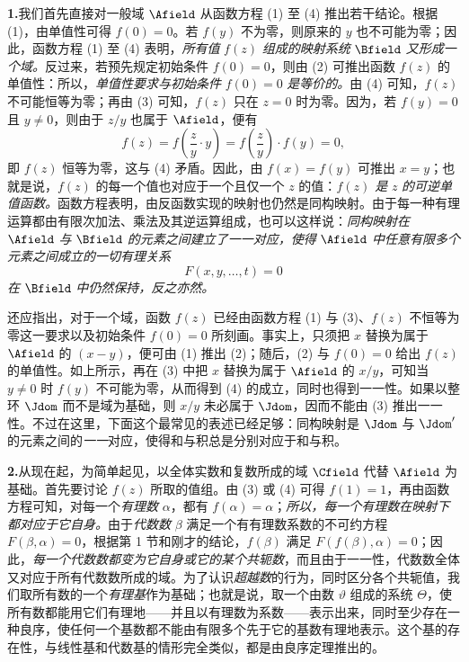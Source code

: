 \medskip
\noindent\textbf{1.}\quad 我们首先直接对一般域 \(\Afield\) 从函数方程 (1) 至 (4) 推出若干结论。根据 (1)，由单值性可得 \(f(0)=0\)。若 \(f(y)\) 不为零，则原来的 \(y\) 也不可能为零；因此，函数方程 (1) 至 (4) 表明，\emph{所有值} \(f(z)\) \emph{组成的映射系统} \(\Bfield\) \emph{又形成一个域。}反过来，若预先规定初始条件 \(f(0)=0\)，则由 (2) 可推出函数 \(f(z)\) 的单值性：所以，\emph{单值性要求与初始条件} \(f(0)=0\) \emph{是等价的。}由 (4) 可知，\(f(z)\) 不可能恒等为零；再由 (3) 可知，\(f(z)\) 只在 \(z=0\) 时为零。因为，若 \(f(y)=0\) 且 \(y\ne0\)，则由于 \(z/y\) 也属于 \(\Afield\)，便有
\[
f(z)=f\!\left(\frac{z}{y}\cdot y\right)=f\!\left(\frac{z}{y}\right)\cdot f(y)=0,
\]
即 \(f(z)\) 恒等为零，这与 (4) 矛盾。因此，由 \(f(x)=f(y)\) 可推出 \(x=y\)；也就是说，\(f(z)\) 的每一个值也对应于一个且仅一个 \(z\) 的值：\emph{\(f(z)\) 是} \(z\) \emph{的可逆单值函数。}函数方程表明，由反函数实现的映射也仍然是同构映射。由于每一种有理运算都由有限次加法、乘法及其逆运算组成，也可以这样说：\emph{同构映射在} \(\Afield\) \emph{与} \(\Bfield\) \emph{的元素之间建立了一一对应，使得} \(\Afield\) \emph{中任意有限多个元素之间成立的一切有理关系}
\[
F(x,y,\ldots,t)=0
\]
\emph{在} \(\Bfield\) \emph{中仍然保持，反之亦然。}

还应指出，对于一个域，函数 \(f(z)\) 已经由函数方程 (1) 与 (3)、\(f(z)\) 不恒等为零这一要求以及初始条件 \(f(0)=0\) 所刻画。事实上，只须把 \(x\) 替换为属于 \(\Afield\) 的 \((x-y)\)，便可由 (1) 推出 (2)；随后，(2) 与 \(f(0)=0\) 给出 \(f(z)\) 的单值性。如上所示，再在 (3) 中把 \(x\) 替换为属于 \(\Afield\) 的 \(x/y\)，可知当 \(y\ne0\) 时 \(f(y)\) 不可能为零，从而得到 (4) 的成立，同时也得到一一性。如果以整环 \(\Jdom\) 而不是域为基础，则 \(x/y\) 未必属于 \(\Jdom\)，因而不能由 (3) 推出一一性。不过在这里，下面这个最常见的表述已经足够：同构映射是 \(\Jdom\) 与 \(\Jdom'\) 的元素之间的\emph{一一}对应，使得和与积总是分别对应于和与积。

\medskip
\noindent\textbf{2.}\quad 从现在起，为简单起见，以全体实数和复数所成的域 \(\Cfield\) 代替 \(\Afield\) 为基础。首先要讨论 \(f(z)\) 所取的值组。由 (3) 或 (4) 可得 \(f(1)=1\)，再由函数方程可知，对每一个\emph{有理数} \(\alpha\)，都有 \(f(\alpha)=\alpha\)；\emph{所以，每一个有理数在映射下都对应于它自身。}由于\emph{代数数} \(\beta\) 满足一个有有理数系数的不可约方程 \(F(\beta,\alpha)=0\)，根据第 1 节和刚才的结论，\(f(\beta)\) 满足 \(F(f(\beta),\alpha)=0\)；因此，\emph{每一个代数数都变为它自身或它的某个共轭数}，而且由于一一性，代数数全体又对应于所有代数数所成的域。为了认识\emph{超越数}的行为，同时区分各个共轭值，我们取所有数的一个\emph{有理基}作为基础；也就是说，取一个由数 \(\vartheta\) 组成的系统 \(\Theta\)，使所有数都能用它们有理地——并且以有理数为系数——表示出来，同时至少存在一种良序，使任何一个基数都不能由有限多个先于它的基数有理地表示。这个基的存在性，与线性基和代数基的情形完全类似，都是由良序定理推出的。

